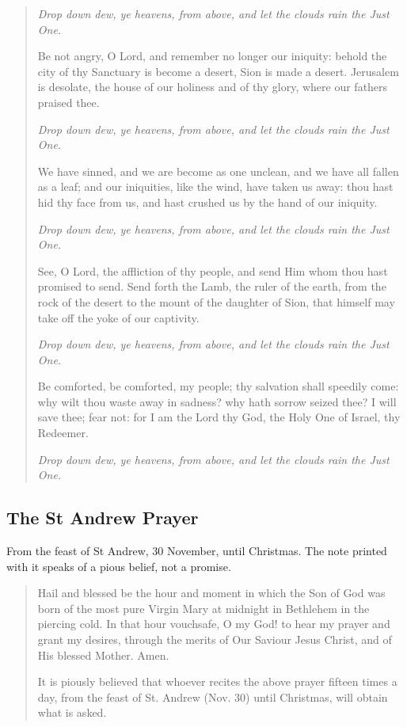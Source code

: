 \begin{quote}
\textit{Drop down dew, ye heavens, from above, and let the clouds rain the Just One.}\par
Be not angry, O Lord, and remember no longer our iniquity: behold the city of thy Sanctuary is become a desert, Sion is made a desert. Jerusalem is desolate, the house of our holiness and of thy glory, where our fathers praised thee.\par
\textit{Drop down dew, ye heavens, from above, and let the clouds rain the Just One.}\par
We have sinned, and we are become as one unclean, and we have all fallen as a leaf; and our iniquities, like the wind, have taken us away: thou hast hid thy face from us, and hast crushed us by the hand of our iniquity.\par
\textit{Drop down dew, ye heavens, from above, and let the clouds rain the Just One.}\par
See, O Lord, the affliction of thy people, and send Him whom thou hast promised to send. Send forth the Lamb, the ruler of the earth, from the rock of the desert to the mount of the daughter of Sion, that himself may take off the yoke of our captivity.\par
\textit{Drop down dew, ye heavens, from above, and let the clouds rain the Just One.}\par
Be comforted, be comforted, my people; thy salvation shall speedily come: why wilt thou waste away in sadness? why hath sorrow seized thee? I will save thee; fear not: for I am the Lord thy God, the Holy One of Israel, thy Redeemer.\par
\textit{Drop down dew, ye heavens, from above, and let the clouds rain the Just One.}\par
\end{quote}

\subsection{The St Andrew Prayer}

From the feast of St Andrew, 30 November, until Christmas. The note printed
with it speaks of a pious belief, not a promise.

\begin{quote}
Hail and blessed be the hour and moment in which the Son of God was born of the most pure Virgin Mary at midnight in Bethlehem in the piercing cold. In that hour vouchsafe, O my God! to hear my prayer and grant my desires, through the merits of Our Saviour Jesus Christ, and of His blessed Mother. Amen.\par
It is piously believed that whoever recites the above prayer fifteen times a day, from the feast of St. Andrew (Nov. 30) until Christmas, will obtain what is asked.\par
\end{quote}

